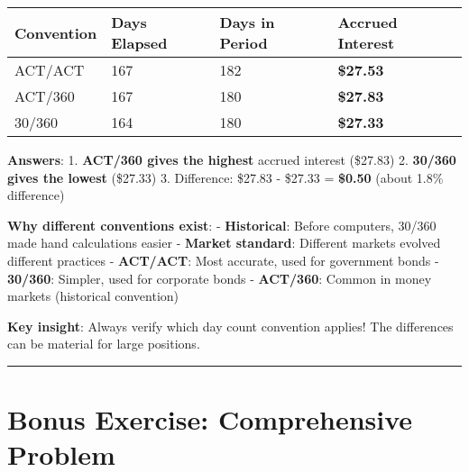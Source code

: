 \documentclass[
  letterpaper,
]{scrbook}
\begin{document}
\begin{tcolorbox}
\begin{longtable}[]{@{}llll@{}}
\toprule\noalign{}
Convention & Days Elapsed & Days in Period & Accrued Interest \\
\midrule\noalign{}
\endhead
\bottomrule\noalign{}
\endlastfoot
ACT/ACT & 167 & 182 & \textbf{\$27.53} \\
ACT/360 & 167 & 180 & \textbf{\$27.83} \\
30/360 & 164 & 180 & \textbf{\$27.33} \\
\end{longtable}

\FloatBarrier

\textbf{Answers}: 1. \textbf{ACT/360 gives the highest} accrued interest
(\$27.83) 2. \textbf{30/360 gives the lowest} (\$27.33) 3. Difference:
\$27.83 - \$27.33 = \textbf{\$0.50} (about 1.8\% difference)

\textbf{Why different conventions exist}: - \textbf{Historical}: Before
computers, 30/360 made hand calculations easier - \textbf{Market
standard}: Different markets evolved different practices -
\textbf{ACT/ACT}: Most accurate, used for government bonds -
\textbf{30/360}: Simpler, used for corporate bonds - \textbf{ACT/360}:
Common in money markets (historical convention)

\textbf{Key insight}: Always verify which day count convention applies!
The differences can be material for large positions.

\end{tcolorbox}

\begin{center}\rule{0.5\linewidth}{0.5pt}\end{center}

\section{Bonus Exercise: Comprehensive
Problem}\label{bonus-exercise-comprehensive-problem}
\end{document}
